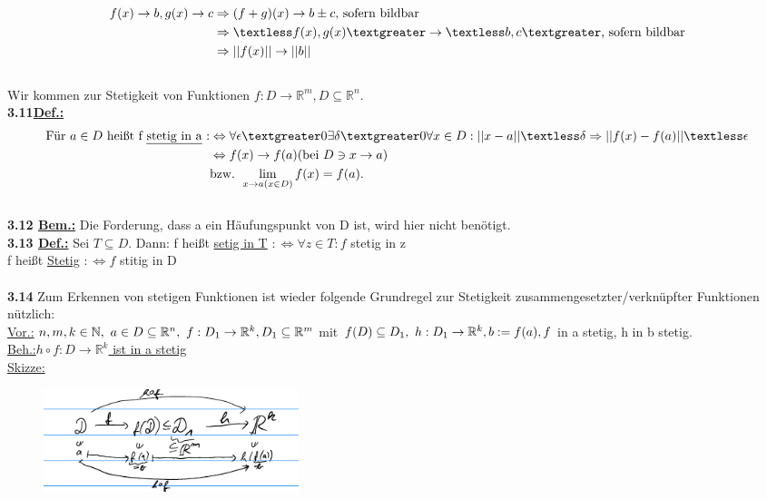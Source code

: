 \documentclass[]{scrartcl}
\begin{document}
	\begin{align}
		f(x)\rightarrow b, g(x)\rightarrow c & \Rightarrow 
		(f+g)(x)\rightarrow b \pm c\text{, sofern bildbar}\\
		& \Rightarrow \textless f(x), g(x)\textgreater\rightarrow\textless 
		b,c\textgreater\text{, sofern bildbar}\\
		& \Rightarrow ||f(x)|| \rightarrow ||b||
	\end{align}
\\
	Wir kommen zur Stetigkeit von Funktionen $f:D\rightarrow\mathbb{R}^m, 
	D\subseteq\mathbb{R}^n.$\\
	\textbf{3.11\underline{Def.:}}\\
	\begin{align}
		\text{Für }a\in D \text{ heißt f \ul{stetig in a} :} &\Leftrightarrow 
		\forall \epsilon\textgreater0 \exists \delta \textgreater 0 \forall x 
		\in D:||x-a||\textless \delta \Rightarrow ||f(x)-f(a)|| 
		\textless\epsilon\\
		& \Leftrightarrow f(x)\rightarrow f(a) (\text{bei } D\ni x \rightarrow 
		a)\\
		&\text{bzw. }\lim_{x\rightarrow a (x \in D)} f(x)= f(a).
	\end{align}
	\\
	\textbf{3.12 \underline{Bem.:}} Die Forderung, dass a ein Häufungspunkt von 
	D ist, wird hier nicht benötigt.\\
	\textbf{3.13 \underline{Def.:}} Sei $T\subseteq D$. Dann: f heißt \ul{setig 
	in T} $:\Leftrightarrow \forall z \in T: f$ stetig in z\\
	f heißt \ul{Stetig} $:\Leftrightarrow f$ stitig in D\\
	\\
	\textbf{3.14} Zum Erkennen von stetigen Funktionen ist wieder folgende 
	Grundregel zur Stetigkeit zusammengesetzter/verknüpfter Funktionen 
	nützlich:\\
	\underline{Vor.:} $n,m,k\in \mathbb{N},\ a \in D\subseteq \mathbb{R}^n,\ 
	f:D_1\rightarrow\mathbb{R}^k,\\
	D_1 \subseteq\mathbb{R}^m$ mit $f(D)\subseteq D_1,\ 
	h:D_1\rightarrow\mathbb{R}^k,\\
	b:=f(a), f$ in a stetig, h in b stetig.\\
	\underline{Beh.:}\ul{$h\circ f: D\rightarrow 
	\mathbb{R}^k$ ist in a stetig}\\
	\underline{Skizze:}\\
	\begin{figure}[h]
		\includegraphics[width=7 cm,height=3cm]{skizze kap 3}
	\end{figure}\\
\end{document}
